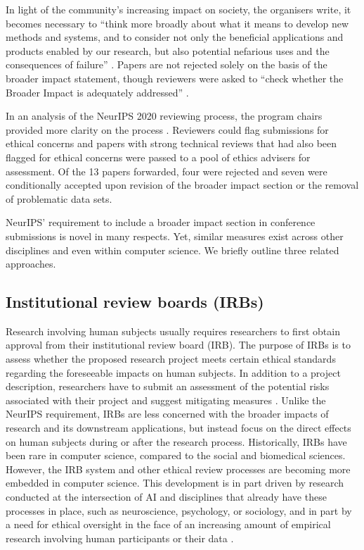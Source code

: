 \documentclass[11pt,english]{article}
\begin{document}
In light of the community's increasing impact on society, the organisers write, it becomes necessary to ``think more broadly about what it means to develop new methods and systems, and to consider not only the beneficial applications and products enabled by our research, but also potential nefarious uses and the consequences of failure'' \citep{NeurIPS_getting_2020}. Papers are not rejected solely on the basis of the broader impact statement, though reviewers were asked to ``check whether the Broader Impact is adequately addressed'' \citep{neurips_faq_neurips_2020}. 

In an analysis of the NeurIPS 2020 reviewing process, the program chairs provided more clarity on the process \citep{lin_what_2020}. Reviewers could flag submissions for ethical concerns and papers with strong technical reviews that had also been flagged for ethical concerns were passed to a pool of ethics advisers for assessment. Of the 13 papers forwarded, four were rejected and seven were conditionally accepted upon revision of the broader impact section or the removal of problematic data sets.

NeurIPS' requirement to include a broader impact section in conference submissions is novel in many respects. Yet, similar measures exist across other disciplines and even within computer science. We briefly outline three related approaches.

\subsection{Institutional review boards (IRBs)}

Research involving human subjects usually requires researchers to first obtain approval from their institutional review board (IRB). The purpose of IRBs is to assess whether the proposed research project meets certain ethical standards regarding the foreseeable impacts on human subjects. In addition to a project description, researchers have to submit an assessment of the potential risks associated with their project and suggest mitigating measures \citep{hamburger_new_2004}. Unlike the NeurIPS requirement, IRBs are less concerned with the broader impacts of research and its downstream applications, but instead focus on the direct effects on human subjects during or after the research process. Historically, IRBs have been rare in computer science, compared to the social and biomedical sciences. However, the IRB system and other ethical review processes are becoming more embedded in computer science. This development is in part driven by research conducted at the intersection of AI and disciplines that already have these processes in place, such as neuroscience, psychology, or sociology, and in part by a need for ethical oversight in the face of an increasing amount of empirical research involving human participants or their data \citep{buchanan_computer_2011,amorim_submit_2019}.
\end{document}

